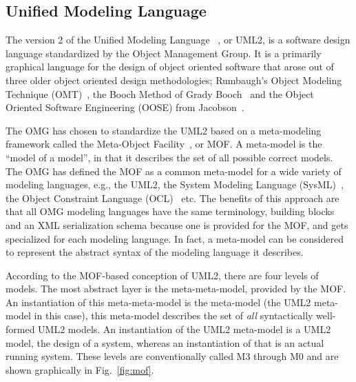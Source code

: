 \subsection{Unified Modeling Language}
The version 2 of the Unified Modeling Language ~\cite{uml-infra,
  uml-super}, or UML2, is a software design language standardized by
the Object Management Group. It is a primarily graphical language for
the design of object oriented software that arose out of three older
object oriented design methodologies; Rumbaugh's Object Modeling
Technique (OMT)~\cite{bruegge@oopsla92}, the Booch Method of Grady
Booch~\cite{white-booch} and the Object Oriented Software Engineering
(OOSE) from Jacobson~\cite{jacobson-oose}.

The OMG has chosen to standardize the UML2 based on a meta-modeling
framework called the Meta-Object Facility~\cite{mof-std}, or MOF. A
meta-model is the ``model of a model'', in that it describes the set
of all possible correct models. The OMG has defined the MOF as a
common meta-model for a wide variety of modeling languages, e.g., the
UML2, the System Modeling Language (SysML)~\cite{sysml}, the Object
Constraint Language (OCL)~\cite{ocl} etc. The benefits of this
approach are that all OMG modeling languages have the same
terminology, building blocks and an XML serialization schema because
one is provided for the MOF, and gets specialized for each modeling
language. In fact, a meta-model can be considered to represent the
abstract syntax of the modeling language it describes.

According to the MOF-based conception of UML2, there are four levels
of models. The most abstract layer is the meta-meta-model, provided by
the MOF. An instantiation of this meta-meta-model is the meta-model
(the UML2 meta-model in this case), this meta-model describes the set
of \emph{all} syntactically well-formed UML2 models. An instantiation
of the UML2 meta-model is a UML2 model, the design of a system,
whereas an instantiation of that is an actual running system. These
levels are conventionally called M3 through M0 and are shown
graphically in Fig.~\ref{fig:mof}.


